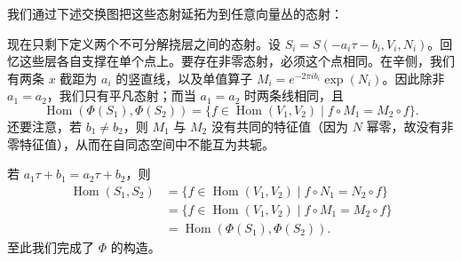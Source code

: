 \documentclass[11pt,a4paper]{article}
\theoremstyle{plain}
\theoremstyle{definition}
\begin{document}
我们通过下述交换图把这些态射延拓为到任意向量丛的态射：
\begin{center}
\begin{lrbox}{\widefigbox}
\end{lrbox}
\resizebox{\linewidth}{!}{\usebox{\widefigbox}}
\end{center}

现在只剩下定义两个不可分解挠层之间的态射。设 $S_i=S(-a_i\tau-b_i,V_i,N_i)$。回忆这些层各自支撑在单个点上。要存在非零态射，必须这个点相同。在辛侧，我们有两条 $x$ 截距为 $a_i$ 的竖直线，以及单值算子 $M_i=e^{-2\pi ib_i}\exp(N_i)$。因此除非 $a_1=a_2$，我们只有平凡态射；而当 $a_1=a_2$ 时两条线相同，且
\[
\operatorname{Hom}(\Phi(S_1),\Phi(S_2))=\bigl\{f\in\operatorname{Hom}(V_1,V_2)\mid f\circ M_1=M_2\circ f\bigr\}.
\]
还要注意，若 $b_1\neq b_2$，则 $M_1$ 与 $M_2$ 没有共同的特征值（因为 $N$ 幂零，故没有非零特征值），从而在自同态空间中不能互为共轭。

若 $a_1\tau+b_1=a_2\tau+b_2$，则
\begin{align*}
\operatorname{Hom}(S_1,S_2)&=\bigl\{f\in\operatorname{Hom}(V_1,V_2)\mid f\circ N_1=N_2\circ f\bigr\}\\
&=\bigl\{f\in\operatorname{Hom}(V_1,V_2)\mid f\circ M_1=M_2\circ f\bigr\}\\
&=\operatorname{Hom}(\Phi(S_1),\Phi(S_2)).
\end{align*}
至此我们完成了 $\Phi$ 的构造。

\end{document}
